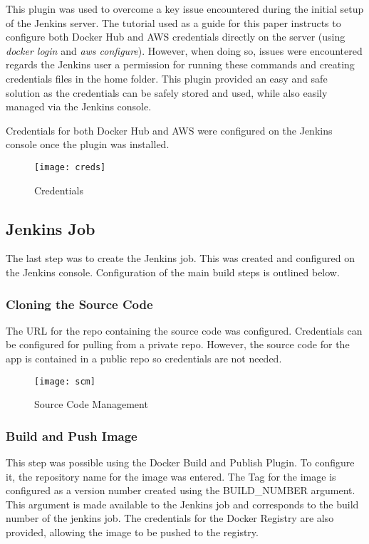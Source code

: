 		This plugin was used to overcome a key issue encountered during the initial setup of the Jenkins server. The tutorial used as a guide for this paper instructs to configure both Docker Hub and AWS credentials directly on the server (using \textit{docker login} and \textit{aws configure}). However, when doing so, issues were encountered regards the Jenkins user a permission for running these commands and creating credentials files in the home folder. This plugin provided an easy and safe solution as the credentials can be safely stored and used, while also easily managed via the Jenkins console.
		
		Credentials for both Docker Hub and AWS were configured on the Jenkins console once the plugin was installed.
		
		\begin{figure}[H]
			\caption{Credentials}
			\centering
			\texttt{[image: creds]}
			\label{fig:creds}
		\end{figure}

	\subsection{Jenkins Job}
	The last step was to create the Jenkins job. This was created and configured on the Jenkins console. Configuration of the main build steps is outlined below.
	

		\subsubsection{Cloning the Source Code}
		The URL for the repo containing the source code was configured. Credentials can be configured for pulling from a private repo. However, the source code for the app is contained in a public repo so credentials are not needed.
		
		\begin{figure}[H]
			\caption{Source Code Management}
			\centering
			\texttt{[image: scm]}
			\label{fig:scm}
		\end{figure}
	
		\subsubsection{Build and Push Image}
		This step was possible using the Docker Build and Publish Plugin. To configure it, the repository name for the image was entered. The Tag for the image is configured as a version number created using the BUILD\_NUMBER argument. This argument is made available to the Jenkins job and corresponds to the build number of the jenkins job. The credentials for the Docker Registry are also provided, allowing the image to be pushed to the registry.
		

